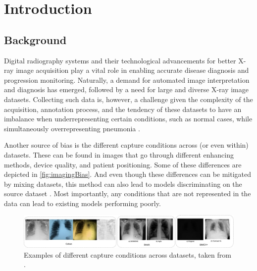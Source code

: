 \documentclass[nomenclature, english, bibtex]{kththesis}
\numberwithin{listing}{chapter}
\begin{document}

\ifnomenclature
    \cleardoublepage
    \printnomenclature
\fi

\label{pg:lastPageofPreface}
\mainmatter
\glsresetall
\renewcommand{\chaptermark}[1]{\markboth{#1}{}}
\chapter{Introduction}

\section{Background}


Digital radiography systems and their technological advancements for better X-ray image acquisition play a vital role in
enabling accurate disease diagnosis and progression monitoring. Naturally, a demand for automated image interpretation
and diagnosis has emerged, followed by a need for large and diverse X-ray image datasets. Collecting
such data is, however, a challenge given the complexity of the acquisition, annotation process,
and the tendency of these datasets to have an imbalance when underrepresenting certain conditions, such as normal cases,
while simultaneously overrepresenting pneumonia \cite{ansariMitigatingRiskMedical2025}.

Another source of bias is the different capture conditions across (or even within) datasets. These can be found
in images that go through different enhancing methods, device quality, and patient positioning. Some of these
differences are depicted in \autoref{fig:imagingBias}. And even though these differences can be mitigated by
mixing datasets, this method can also lead to models discriminating on the source dataset \cite{arias-garzonBiasesAssociatedDatabase2023}.
Most importantly, any conditions that are not represented in the data can lead to existing models performing poorly.

\begin{figure}
    \centering
    \includegraphics[width=\textwidth]{figures/imaging_bias.jpeg}
    \caption{Examples of different capture conditions across datasets, taken from \cite[Figure~6]{arias-garzonBiasesAssociatedDatabase2023}.}
    \label{fig:imagingBias}
\end{figure}
\end{document}

